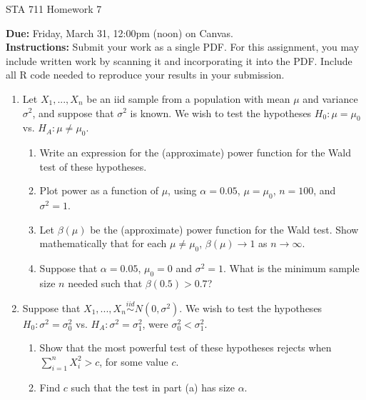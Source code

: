 \documentclass[11pt]{article}
\begin{document}
\begin{center}
\Large
STA 711 Homework 7\\
\normalsize
\vspace{5mm}
\end{center}

\noindent \textbf{Due:} Friday, March 31, 12:00pm (noon) on Canvas.\\ 

\noindent \textbf{Instructions:} Submit your work as a single PDF. For this assignment, you may include written work by scanning it and incorporating it into the PDF. Include all R code needed to reproduce your results in your submission.


\begin{enumerate}
\item Let $X_1,...,X_n$ be an iid sample from a population with mean $\mu$ and variance $\sigma^2$, and suppose that $\sigma^2$ is known. We wish to test the hypotheses $H_0: \mu = \mu_0$ vs. $H_A: \mu \neq \mu_0$.

\begin{enumerate}
\item Write an expression for the (approximate) power function for the Wald test of these hypotheses.
\item Plot power as a function of $\mu$, using $\alpha = 0.05$, $\mu = \mu_0$, $n = 100$, and $\sigma^2 = 1$.
\item Let $\beta(\mu)$ be the (approximate) power function for the Wald test. Show mathematically that for each $\mu \neq \mu_0$, $\beta(\mu) \to 1$ as $n \to \infty$.
\item Suppose that $\alpha = 0.05$, $\mu_0 = 0$ and $\sigma^2 = 1$. What is the minimum sample size $n$ needed such that $\beta(0.5) > 0.7$?
\end{enumerate}

\item Suppose that $X_1,...,X_n \overset{iid}{\sim} N(0, \sigma^2)$. We wish to test the hypotheses $H_0: \sigma^2 = \sigma_0^2$ vs. $H_A: \sigma^2 = \sigma_1^2$, were $\sigma_0^2 < \sigma_1^2$.

\begin{enumerate}
\item Show that the most powerful test of these hypotheses rejects when $\sum \limits_{i=1}^n X_i^2 > c$, for some value $c$.
\item Find $c$ such that the test in part (a) has size $\alpha$.
\end{enumerate}


\end{enumerate}
\end{document}
